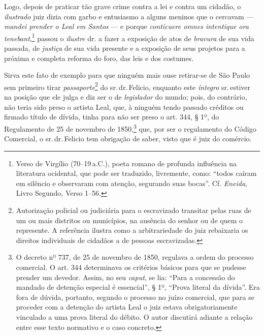 Logo, depois de praticar tão grave crime contra a lei e contra um
cidadão, o \emph{ilustrado} juiz dizia com garbo e entusiasmo a alguns
meninos que o cercavam --- \emph{mandei prender o Leal em Santos} --- e
porque \emph{conticuere omnes intentique ora tenebant},\footnote{ Verso
  de Virgílio (70--19\,a.C.), poeta romano de profunda influência na
  literatura ocidental, que pode ser traduzido, livremente, como: ``todos
  caíram em silêncio e observaram com atenção, segurando suas bocas''.
  Cf. \emph{Eneida}, Livro Segundo, Verso 1--56.} passou o \emph{ilustre}
dr. a fazer a exposição de atos de \emph{bravura} de sua vida passada,
de \emph{justiça} de sua vida presente e a exposição de seus projetos
para a próxima e completa reforma do foro, das leis e dos costumes.

Sirva este fato de exemplo para que ninguém mais ouse retirar-se de São
Paulo sem primeiro tirar \emph{passaporte}\footnote{ Autorização
  policial ou judiciária para o escravizado transitar pelas ruas de um
  ou mais distritos ou municípios, na ausência do senhor ou de quem o
  represente. A referência ilustra como a arbitrariedade do juiz
  rebaixaria os direitos individuais de cidadãos a de pessoas
  escravizadas.} do sr.\,dr.\,Felicio, enquanto este \emph{íntegro} sr.\,estiver na posição que ele julga e diz ser o de \emph{legislador} do
mundo; pois, do contrário, não teria sido preso o artista Leal, que, à
ninguém tendo passado créditos ou firmado título de dívida, tinha para
não ser preso o art. 344, § 1º, do Regulamento de 25 de novembro de
1850,\footnote{ O decreto nº 737, de 25 de novembro de 1850, regulava a ordem do
  processo comercial. O art. 344 determinava os critérios básicos para
  que se pudesse prender um devedor. Assim, no seu \emph{caput}, se lia:
  ``Para a concessão do mandado de detenção especial é essencial'', § 1º,
  ``Prova literal da dívida''. Era fora de dúvida, portanto, segundo o
  processo no juízo comercial, que para se proceder com a detenção do
  artista Leal o juiz estava obrigatoriamente vinculado a uma prova
  literal do débito. O autor discutirá adiante a relação entre esse
  texto normativo e o caso concreto.} que, por ser o regulamento do
Código Comercial, o sr.\,dr.\,Felicio tem obrigação de saber, visto que é
juiz do comércio.

